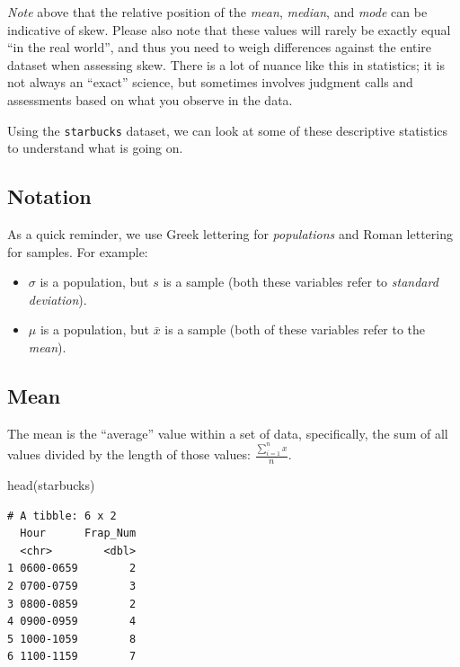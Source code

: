 \documentclass[
  letterpaper,
  DIV=11,
  numbers=noendperiod]{scrreprt}
\newenvironment{Shaded}{\begin{snugshade}}{\end{snugshade}}
\newcommand{\FunctionTok}[1]{\textcolor[rgb]{0.28,0.35,0.67}{#1}}
\newcommand{\NormalTok}[1]{\textcolor[rgb]{0.00,0.23,0.31}{#1}}
\begin{document}
\emph{Note} above that the relative position of the \emph{mean},
\emph{median}, and \emph{mode} can be indicative of skew. Please also
note that these values will rarely be exactly equal ``in the real
world'', and thus you need to weigh differences against the entire
dataset when assessing skew. There is a lot of nuance like this in
statistics; it is not always an ``exact'' science, but sometimes
involves judgment calls and assessments based on what you observe in the
data.

Using the \texttt{starbucks} dataset, we can look at some of these
descriptive statistics to understand what is going on.

\subsection{Notation}\label{notation}

As a quick reminder, we use Greek lettering for \emph{populations} and
Roman lettering for samples. For example:

\begin{itemize}
\item
  \(\sigma\) is a population, but \(s\) is a sample (both these
  variables refer to \emph{standard deviation}).
\item
  \(\mu\) is a population, but \(\bar{x}\) is a sample (both of these
  variables refer to the \emph{mean}).
\end{itemize}

\subsection{Mean}\label{mean}

The mean is the ``average'' value within a set of data, specifically,
the sum of all values divided by the length of those values:
\(\frac{\sum_{i=1}^nx}{n}\).

\begin{Shaded}
\begin{Highlighting}[]
\FunctionTok{head}\NormalTok{(starbucks)}
\end{Highlighting}
\end{Shaded}

\begin{verbatim}
# A tibble: 6 x 2
  Hour      Frap_Num
  <chr>        <dbl>
1 0600-0659        2
2 0700-0759        3
3 0800-0859        2
4 0900-0959        4
5 1000-1059        8
6 1100-1159        7
\end{verbatim}
\end{document}
